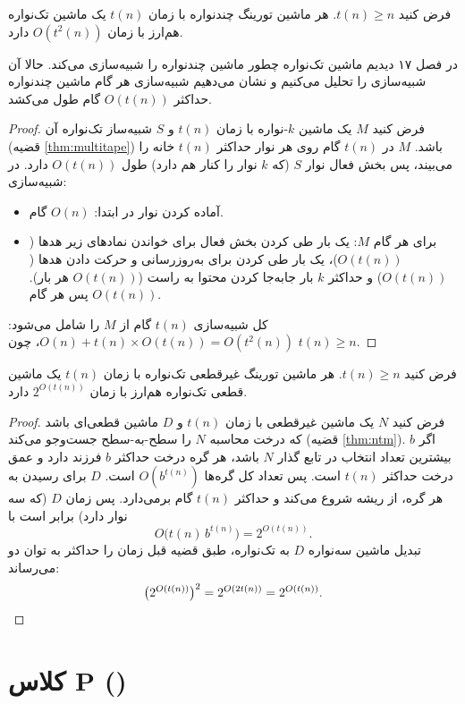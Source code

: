 \begin{theorem}
فرض کنید $t(n)\ge n$. هر ماشین تورینگ چندنواره با زمان $t(n)$ یک ماشین تک‌نواره هم‌ارز با زمان $O(t^2(n))$ دارد.
\end{theorem}
\begin{proofidea}
در فصل ۱۷ دیدیم ماشین تک‌نواره چطور ماشین چندنواره را شبیه‌سازی می‌کند. حالا آن شبیه‌سازی را تحلیل می‌کنیم و نشان می‌دهیم شبیه‌سازی هر گام ماشین چندنواره حداکثر $O(t(n))$ گام طول می‌کشد.
\end{proofidea}
\begin{proof}
فرض کنید $M$ یک ماشین $k$-نواره با زمان $t(n)$ و $S$ شبیه‌ساز تک‌نواره آن (قضیه \ref{thm:multitape}) باشد. $M$ در $t(n)$ گام روی هر نوار حداکثر $t(n)$ خانه را می‌بیند، پس بخش فعال نوار $S$ (که $k$ نوار را کنار هم دارد) طول $O(t(n))$ دارد. در شبیه‌سازی:
\begin{itemize}
\item آماده کردن نوار در ابتدا: $O(n)$ گام.
\item برای هر گام $M$: یک بار طی کردن بخش فعال برای خواندن نمادهای زیر هدها ($O(t(n))$)، یک بار طی کردن برای به‌روزرسانی و حرکت دادن هدها ($O(t(n))$) و حداکثر $k$ بار جابه‌جا کردن محتوا به راست ($O(t(n))$ هر بار). پس هر گام $O(t(n))$.
\end{itemize}
کل شبیه‌سازی $t(n)$ گام از $M$ را شامل می‌شود: $O(n)+t(n)\times O(t(n))=O(t^2(n))$، چون $t(n)\ge n$.
\end{proof}

\begin{theorem}
فرض کنید $t(n)\ge n$. هر ماشین تورینگ غیرقطعی تک‌نواره با زمان $t(n)$ یک ماشین قطعی تک‌نواره هم‌ارز با زمان $2^{O(t(n))}$ دارد.
\end{theorem}
\begin{proof}
فرض کنید $N$ یک ماشین غیرقطعی با زمان $t(n)$ و $D$ ماشین قطعی‌ای باشد که درخت محاسبه $N$ را سطح-به-سطح جست‌وجو می‌کند (قضیه \ref{thm:ntm}). اگر $b$ بیشترین تعداد انتخاب در تابع گذار $N$ باشد، هر گره درخت حداکثر $b$ فرزند دارد و عمق درخت حداکثر $t(n)$ است. پس تعداد کل گره‌ها $O(b^{t(n)})$ است. $D$ برای رسیدن به هر گره، از ریشه شروع می‌کند و حداکثر $t(n)$ گام برمی‌دارد. پس زمان $D$ (که سه نوار دارد) برابر است با
\[O\big(t(n)\,b^{t(n)}\big)=2^{O(t(n))}.\]
تبدیل ماشین سه‌نواره $D$ به تک‌نواره، طبق قضیه قبل زمان را حداکثر به توان دو می‌رساند:
\[\big(2^{O(t(n))}\big)^2=2^{O(2t(n))}=2^{O(t(n))}.\qedhere\]
\end{proof}

\section{کلاس P ()}

